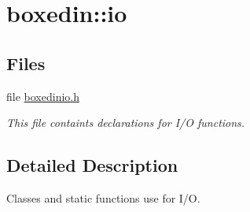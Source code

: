 \hypertarget{group__boxedin__io__group}{\section{boxedin\+:\+:io}
\label{group__boxedin__io__group}
}
\subsection*{Files}
\begin{DoxyCompactItemize}
\item 
file \hyperlink{boxedinio_8h}{boxedinio.\+h}
\begin{DoxyCompactList}\small\item\em This file containts declarations for I/\+O functions. \end{DoxyCompactList}\end{DoxyCompactItemize}


\subsection{Detailed Description}
Classes and static functions use for I/\+O. 